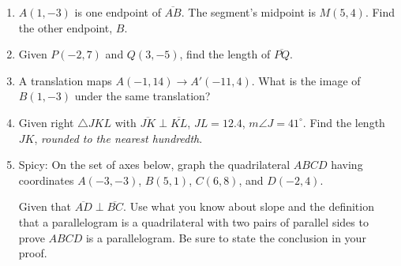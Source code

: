 \documentclass[12pt, twoside]{article}
\begin{document}
\begin{enumerate}
  \newpage

    \item $A(1,-3)$ is one endpoint of $\overline{AB}$. The segment's midpoint is $M(5,4)$. Find the other endpoint, $B$. \vspace{3cm}

    \item Given $P(-2,7)$ and $Q(3,-5)$, find the length of $\overline{PQ}$.
        \vspace{4cm}

    \item A translation maps $A(-1,14) \rightarrow A'(-11,4)$. What is the image of $B(1,-3)$ under the same translation?  \vspace{3cm}


  \item Given right $\triangle JKL$ with $\overline{JK} \perp \overline{KL}$, $JL=12.4$, $m\angle J=41^\circ$. Find the length $JK$, \emph{rounded to the nearest hundredth}.
    \begin{center}
    \end{center}


\newpage


  \item Spicy: On the set of axes below, graph the quadrilateral $ABCD$ having coordinates $A(-3,-3)$, $B(5,1)$, $C(6,8)$, and $D(-2,4)$.
    \begin{center} %
    \end{center}
    Given that $\overline{AD} \perp \overline{BC}$. Use what you know about slope and the definition that a parallelogram is a quadrilateral with two pairs of parallel sides to prove $ABCD$ is a parallelogram. Be sure to state the conclusion in your proof.



  \end{enumerate}

  
\end{document}
